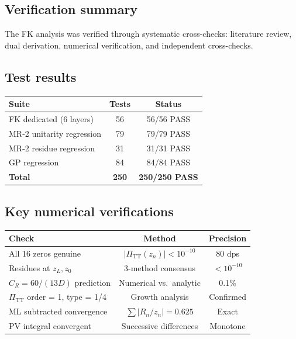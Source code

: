 \documentclass[11pt,a4paper]{article}
\newcommand{\PiTT}{\Pi_{\mathrm{TT}}}
\begin{document}
\subsection{Verification summary}

The FK analysis was verified through systematic cross-checks:
literature review, dual derivation, numerical verification,
and independent cross-checks.

\subsection{Test results}

\begin{center}
\begin{tabular}{lcc}
\toprule
Suite & Tests & Status \\
\midrule
FK dedicated (6 layers) & 56 & 56/56 PASS \\
MR-2 unitarity regression & 79 & 79/79 PASS \\
MR-2 residue regression & 31 & 31/31 PASS \\
GP regression & 84 & 84/84 PASS \\
\midrule
\textbf{Total} & \textbf{250} & \textbf{250/250 PASS} \\
\bottomrule
\end{tabular}
\end{center}

\subsection{Key numerical verifications}

\begin{center}
\begin{tabular}{lcc}
\toprule
Check & Method & Precision \\
\midrule
All 16 zeros genuine & $|\PiTT(z_n)| < 10^{-10}$ & 80 dps \\
Residues at $z_L, z_0$ & 3-method consensus & $< 10^{-10}$ \\
$C_R = 60/(13D)$ prediction & Numerical vs.\ analytic & 0.1\% \\
$\PiTT$ order = 1, type = 1/4 & Growth analysis & Confirmed \\
ML subtracted convergence & $\sum |R_n/z_n| = 0.625$ & Exact \\
PV integral convergent & Successive differences & Monotone \\
\bottomrule
\end{tabular}
\end{center}
\end{document}
